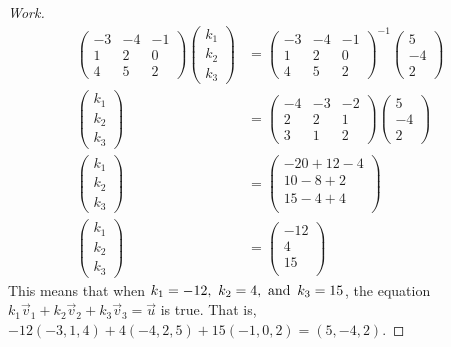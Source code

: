 \documentclass{article}
\begin{document}
\begin{proof}[Work]
\begin{align*}
    \begin{pmatrix}
      -3 & -4 & -1 \\
      1  & 2  & 0  \\
      4  & 5  & 2
    \end{pmatrix}
    \begin{pmatrix}
      k_1 \\
      k_2 \\
      k_3
    \end{pmatrix} & =
    \begin{pmatrix}
      -3 & -4 & -1 \\
      1  & 2  & 0  \\
      4  & 5  & 2
    \end{pmatrix}^{-1}
    \begin{pmatrix}
      5  \\
      -4 \\
      2
    \end{pmatrix}    \\
    \begin{pmatrix}
      k_1 \\
      k_2 \\
      k_3
    \end{pmatrix} & =
    \begin{pmatrix}
      -4 & -3 & -2 \\
      2  & 2  & 1  \\
      3  & 1  & 2
    \end{pmatrix}
    \begin{pmatrix}
      5  \\
      -4 \\
      2
    \end{pmatrix}    \\
    \begin{pmatrix}
      k_1 \\
      k_2 \\
      k_3
    \end{pmatrix} & =
    \begin{pmatrix}
      -20 + 12 - 4 \\
      10 - 8 + 2   \\
      15 - 4 + 4   \\
    \end{pmatrix}    \\
    \begin{pmatrix}
      k_1 \\
      k_2 \\
      k_3
    \end{pmatrix} & =
    \begin{pmatrix}
      -12 \\
      4   \\
      15  \\
    \end{pmatrix}
  \end{align*}
  This means that when $k_1 = -12,~k_2 = 4, \operatorname{~\text{and}~} k_3 = 15$, the equation $k_1\vec{v}_1 + k_2\vec{v}_2 + k_3\vec{v}_3 = \vec{u}$ is true. That is, $-12(-3,1,4) + 4(-4,2,5) + 15(-1,0,2) = (5,-4,2)$.
\end{proof}
\qdash
\end{document}
